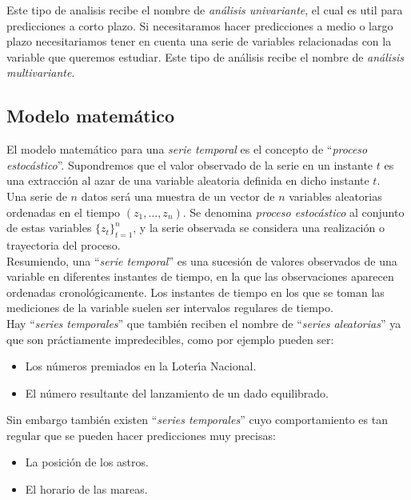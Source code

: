Este tipo de analisis recibe el nombre de \emph{an\'alisis univariante}, el cual
es util para predicciones a corto plazo. Si necesitaramos hacer predicciones a
medio o largo plazo necesitariamos tener en cuenta una serie de variables
relacionadas con la variable que queremos estudiar. Este tipo de an\'alisis
recibe el nombre de \emph{an\'alisis multivariante}.
 
\subsection{Modelo matem\'atico}

El modelo matem\'atico para una \emph{serie temporal} es el concepto de
``\emph{proceso estoc\'astico}''. Supondremos que el valor observado de la serie
en un instante $t$ es una extracci\'on al azar de una variable aleatoria
definida en dicho instante $t$.\\

Una serie de $n$ datos ser\'a una muestra de un vector de $n$ variables
aleatorias ordenadas en el tiempo $(z_1,\ldots,z_n)$. Se denomina
\emph{proceso estoc\'astico} al conjunto de estas variables $\{z_t\}_{t=1}^n$,
y la serie observada se considera una realizaci\'on o trayectoria del proceso.\\

Resumiendo, una ``\emph{serie temporal}'' es una sucesi\'on de valores
observados de una variable en diferentes instantes de tiempo, en la que las
observaciones aparecen ordenadas cronol\'ogicamente. Los instantes de tiempo en
los que se toman las mediciones de la variable suelen ser intervalos regulares
de tiempo.\\

Hay ``\emph{series temporales}'' que tambi\'en reciben el nombre de
``\emph{series aleatorias}'' ya que son pr\'actiamente impredecibles, como por
ejemplo pueden ser:
\begin{itemize}
\item Los n\'umeros premiados en la Loter\'{\i}a Nacional.
\item El n\'umero resultante del lanzamiento de un dado equilibrado.
\end{itemize}

Sin embargo tambi\'en existen ``\emph{series temporales}'' cuyo comportamiento
es tan regular que se pueden hacer predicciones muy precisas:
\begin{itemize}
\item La posici\'on de los astros.
\item El horario de las mareas.
\end{itemize}

